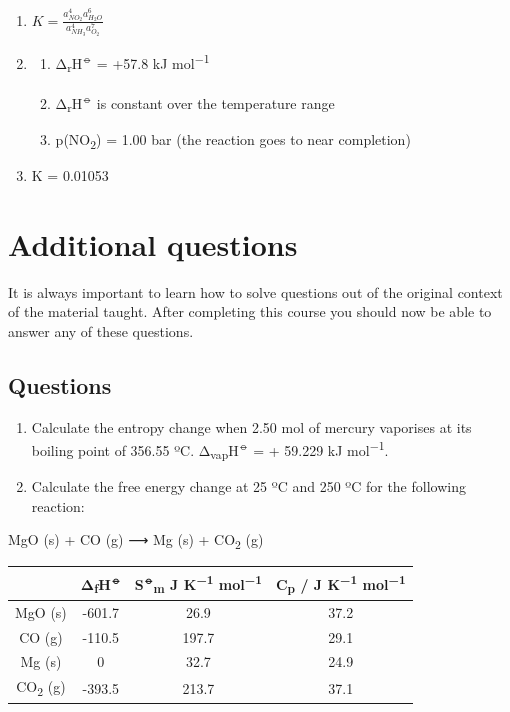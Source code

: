 \documentclass[
]{book}
\providecommand{\tightlist}{%
  \setlength{\itemsep}{0pt}\setlength{\parskip}{0pt}}
\begin{document}
\begin{enumerate}
\def\labelenumi{\arabic{enumi}.}
\item
  \(K = \frac{a_{NO_2}^4 a_{H_2O}^6}{a_{NH_3}^4 a_{O_2}^7}\)
\item
  \begin{enumerate}
  \def\labelenumii{\alph{enumii}.}
  \tightlist
  \item
    Δ\textsubscript{r}H\textsuperscript{⦵} = +57.8 kJ mol\textsuperscript{−1}
  \item
    Δ\textsubscript{r}H\textsuperscript{⦵} is constant over the temperature range
  \item
    p(NO\textsubscript{2}) = 1.00 bar (the reaction goes to near completion)
  \end{enumerate}
\item
  K = 0.01053
\end{enumerate}

\hypertarget{additional-questions}{%
\chapter{Additional questions}\label{additional-questions}}

It is always important to learn how to solve questions out of the original context of the material taught. After completing this course you should now be able to answer any of these questions.

\hypertarget{questions-3}{%
\section{Questions}\label{questions-3}}

\begin{enumerate}
\def\labelenumi{\arabic{enumi}.}
\item
  Calculate the entropy change when 2.50 mol of mercury vaporises at its boiling point of 356.55 ºC. Δ\textsubscript{vap}H\textsuperscript{⦵} = + 59.229 kJ mol\textsuperscript{−1}.
\item
  Calculate the free energy change at 25 ºC and 250 ºC for the following reaction:
\end{enumerate}

MgO (s) + CO (g) ⟶ Mg (s) + CO\textsubscript{2} (g)

\begin{longtable}[]{@{}cccc@{}}
\toprule
& Δ\textsubscript{f}H\textsuperscript{⦵} & S\textsuperscript{⦵}\textsubscript{m} J K\textsuperscript{−1} mol\textsuperscript{−1} & C\textsubscript{p} / J K\textsuperscript{−1} mol\textsuperscript{−1}\tabularnewline
\midrule
\endhead
MgO (s) & -601.7 & 26.9 & 37.2\tabularnewline
CO (g) & -110.5 & 197.7 & 29.1\tabularnewline
Mg (s) & 0 & 32.7 & 24.9\tabularnewline
CO\textsubscript{2} (g) & -393.5 & 213.7 & 37.1\tabularnewline
\bottomrule
\end{longtable}
\end{document}
